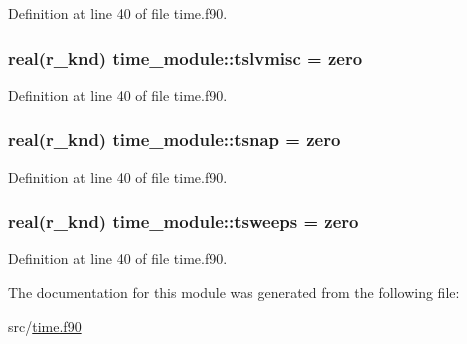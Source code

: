 Definition at line 40 of file time.\-f90.

\hypertarget{classtime__module_ae8ff3e794ae2fcb536002fc5ba9e6c72}{
\subsubsection[{tslvmisc}]{\setlength{\rightskip}{0pt plus 5cm}real(r\-\_\-knd) time\-\_\-module\-::tslvmisc = zero}}\label{classtime__module_ae8ff3e794ae2fcb536002fc5ba9e6c72}


Definition at line 40 of file time.\-f90.

\hypertarget{classtime__module_aa8ee658575005edd9d28a62a468cfde2}{
\subsubsection[{tsnap}]{\setlength{\rightskip}{0pt plus 5cm}real(r\-\_\-knd) time\-\_\-module\-::tsnap = zero}}\label{classtime__module_aa8ee658575005edd9d28a62a468cfde2}


Definition at line 40 of file time.\-f90.

\hypertarget{classtime__module_aac45a44eaf19a7bea1d8f553c3a552be}{
\subsubsection[{tsweeps}]{\setlength{\rightskip}{0pt plus 5cm}real(r\-\_\-knd) time\-\_\-module\-::tsweeps = zero}}\label{classtime__module_aac45a44eaf19a7bea1d8f553c3a552be}


Definition at line 40 of file time.\-f90.



The documentation for this module was generated from the following file\-:\begin{DoxyCompactItemize}
\item 
src/\hyperlink{time_8f90}{time.\-f90}\end{DoxyCompactItemize}
